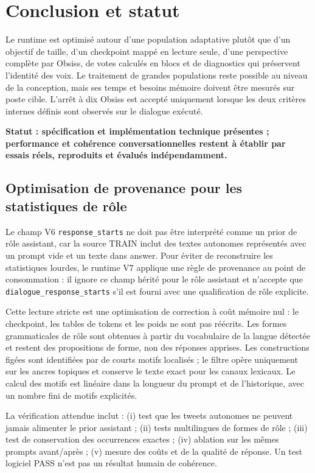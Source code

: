 \documentclass[11pt,a4paper]{report}
\begin{document}
\chapter{Conclusion et statut}
Le runtime est optimisé autour d'une population adaptative plutôt que d'un objectif de taille, d'un checkpoint mappé en lecture seule, d'une perspective complète par Obsiss, de votes calculés en blocs et de diagnostics qui préservent l'identité des voix. Le traitement de grandes populations reste possible au niveau de la conception, mais ses temps et besoins mémoire doivent être mesurés sur poste cible. L'arrêt à dix Obsiss est accepté uniquement lorsque les deux critères internes définis sont observés sur le dialogue exécuté.

\begin{center}
\textbf{Statut : spécification et implémentation technique présentes ; performance et cohérence conversationnelles restent à établir par essais réels, reproduits et évalués indépendamment.}
\end{center}


\section{Optimisation de provenance pour les statistiques de rôle}

Le champ V6 \texttt{response\_starts} ne doit pas être interprété comme un prior de rôle assistant, car la source TRAIN inclut des textes autonomes représentés avec un prompt vide et un texte dans answer. Pour éviter de reconstruire les statistiques lourdes, le runtime V7 applique une règle de provenance au point de consommation : il ignore ce champ hérité pour le rôle assistant et n'accepte que \texttt{dialogue\_response\_starts} s'il est fourni avec une qualification de rôle explicite.

Cette lecture stricte est une optimisation de correction à coût mémoire nul : le checkpoint, les tables de tokens et les poids ne sont pas réécrits. Les formes grammaticales de rôle sont obtenues à partir du vocabulaire de la langue détectée et restent des propositions de forme, non des réponses apprises. Les constructions figées sont identifiées par de courts motifs localisés ; le filtre opère uniquement sur les ancres topiques et conserve le texte exact pour les canaux lexicaux. Le calcul des motifs est linéaire dans la longueur du prompt et de l'historique, avec un nombre fini de motifs explicités.

La vérification attendue inclut : (i) test que les tweets autonomes ne peuvent jamais alimenter le prior assistant ; (ii) tests multilingues de formes de rôle ; (iii) test de conservation des occurrences exactes ; (iv) ablation sur les mêmes prompts avant/après ; (v) mesure des coûts et de la qualité de réponse. Un test logiciel PASS n'est pas un résultat humain de cohérence.
\end{document}

